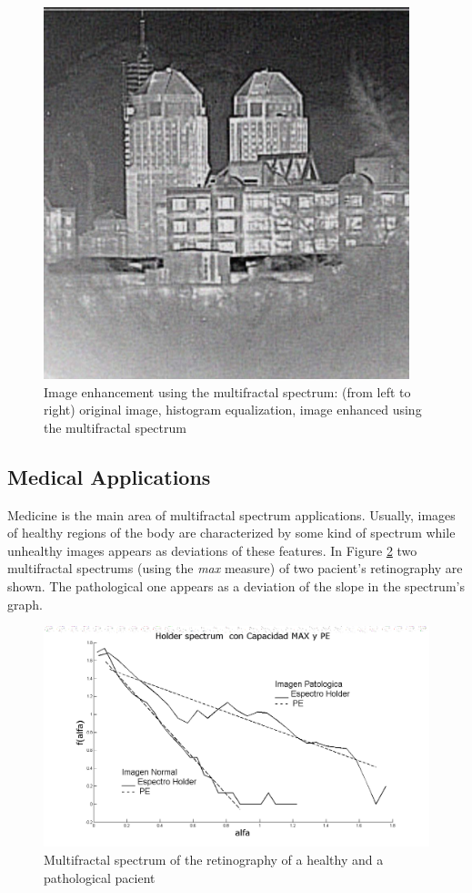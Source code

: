 \documentclass[oneside,a4paper,english,links,12pt]{article}
\begin{document}
\begin{figure}[htb]
\includegraphics[scale=0.35]{imagenes/enhancemfs}
\caption{Image enhancement using the multifractal spectrum: (from left to right) original image, histogram equalization, image enhanced using the multifractal spectrum}
\label{fig:camera}
\end{figure}

\subsection{Medical Applications}
Medicine is the main area of multifractal spectrum applications. Usually, images of healthy regions of the body are characterized by some kind of spectrum while unhealthy images appears as deviations of these features. In Figure \ref{fig:medical} two multifractal spectrums (using the {\em max} measure) of two pacient's retinography are shown. The pathological one appears as a deviation of the slope in the spectrum's graph.

\begin{figure}[htb]
\centering
\includegraphics[scale=0.25]{imagenes/medicalgraph}
\caption{Multifractal spectrum of the retinography of a healthy and a pathological pacient}
\label{fig:medical}
\end{figure}
\end{document}
